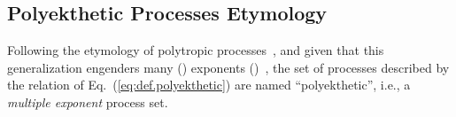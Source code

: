     \subsection{Polyekthetic Processes Etymology}

    Following the  etymology  of  polytropic  processes~\cite{2020-NaaktgeborenC-engrXiv},  and
    given    that    this    generalization    engenders    many    ()    exponents
    ()~\cite{1997-ManiatoglouMPF-Porto}, the set of processes described  by  the
    relation  of   Eq.~(\ref{eq:def.polyekthetic})   are   named   ``polyekthetic'',   i.e.,   a
    \emph{multiple exponent} process set.


